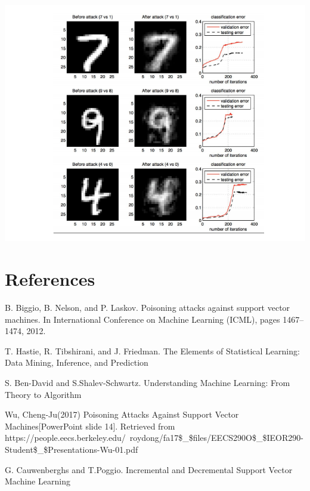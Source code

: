 \documentclass[twoside]{article}
\begin{document}
\begin{center}
\includegraphics[scale=0.8]{finalResult.PNG}
\end{center}

\section{References}

B. Biggio, B. Nelson, and P. Laskov. Poisoning attacks against support vector machines. In
International Conference on Machine Learning (ICML), pages 1467–1474, 2012.

T. Hastie, R. Tibshirani, and J. Friedman. The Elements of Statistical Learning: Data Mining, Inference, and Prediction

S. Ben-David and S.Shalev-Schwartz. Understanding Machine Learning: From Theory to Algorithm

Wu, Cheng-Ju(2017) Poisoning Attacks Against Support Vector Machines[PowerPoint slide 14]. Retrieved from https://people.eecs.berkeley.edu/~roydong/fa17\$\_\$files/EECS290O\$\_\$IEOR290-Student\$\_\$Presentations-Wu-01.pdf

G. Cauwenberghs and T.Poggio. Incremental and Decremental Support Vector Machine Learning
\end{document}
